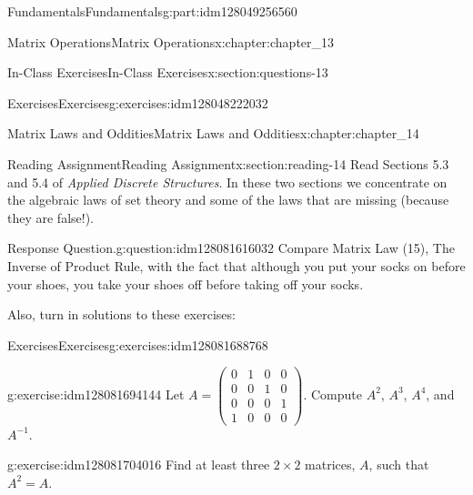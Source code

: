 \documentclass[oneside,10pt,]{book}
\numberwithin{equation}{section}
\begin{document}
\begin{partptx}{Fundamentals}{}{Fundamentals}{}{}{g:part:idm128049256560}
\begin{chapterptx}{Matrix Operations}{}{Matrix Operations}{}{}{x:chapter:chapter_13}
\begin{sectionptx}{In-Class Exercises}{}{In-Class Exercises}{}{}{x:section:questions-13}
\begin{exercises-subsection}{Exercises}{}{Exercises}{}{}{g:exercises:idm128048222032}
\begin{exercisegroup}
\end{exercisegroup}
\par\medskip\noindent
\end{exercises-subsection}
\end{sectionptx}
\end{chapterptx}
%
\typeout{************************************************}
\typeout{************************************************}
%
\begin{chapterptx}{Matrix Laws and Oddities}{}{Matrix Laws and Oddities}{}{}{x:chapter:chapter_14}
%
%
\typeout{************************************************}
\typeout{************************************************}
%
\begin{sectionptx}{Reading Assignment}{}{Reading Assignment}{}{}{x:section:reading-14}
Read Sections 5.3 and 5.4 of \emph{Applied Discrete Structures}.  In these two sections we concentrate on the algebraic laws of set theory and some of the laws that are missing (because they are false!).%
\begin{question}{Response Question.}{g:question:idm128081616032}%
Compare Matrix Law (15), The Inverse of Product Rule, with the fact that although you put your socks on before your shoes, you take your shoes off before taking off your socks.%
\end{question}
Also, turn in solutions to these exercises:%
%
%
\typeout{************************************************}
\typeout{************************************************}
%
\begin{exercises-subsection}{Exercises}{}{Exercises}{}{}{g:exercises:idm128081688768}
\par\medskip\noindent%
%
\begin{exercisegroup}
\begin{divisionexerciseeg}{1}{}{}{g:exercise:idm128081694144}%
Let \(A=\left(\begin{array}{cccc} 0 &1&0&0\\
0 &0&1&0\\
0&0&0&1\\
1 &0&0&0 \end{array}\right)\). Compute \(A^2\), \(A^3\), \(A^4\), and \(A^{-1}\).%
\end{divisionexerciseeg}%
\begin{divisionexerciseeg}{2}{}{}{g:exercise:idm128081704016}%
Find at least three \(2\times2\) matrices, \(A\), such that \(A^2=A\).%

\end{divisionexerciseeg}
\end{exercisegroup}
\end{exercises-subsection}
\end{sectionptx}
\end{chapterptx}
\end{partptx}
\end{document}
